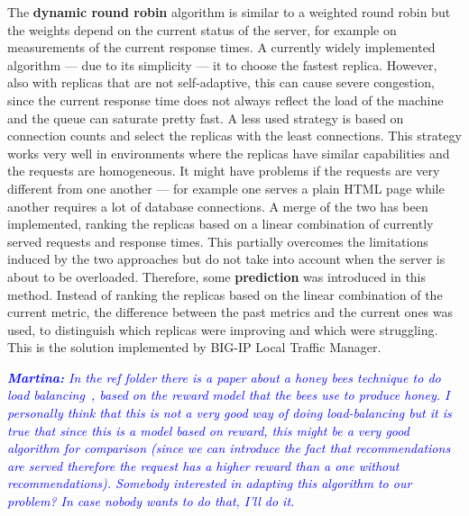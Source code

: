 The \textbf{dynamic round robin} algorithm is similar to a weighted
round robin but the weights depend on the current status of the
server, for example on measurements of the current response times. A
currently widely implemented algorithm --- due to its simplicity ---
it to choose the fastest replica. However, also with replicas that are
not self-adaptive, this can cause severe congestion, since the current
response time does not always reflect the load of the machine and the
queue can saturate pretty fast. A less used strategy is based on
connection counts and select the replicas with the least
connections. This strategy works very well in environments where the
replicas have similar capabilities and the requests are
homogeneous. It might have problems if the requests are very different
from one another --- for example one serves a plain HTML page while
another requires a lot of database connections. A merge of the two has
been implemented, ranking the replicas based on a linear combination
of currently served requests and response times. This partially
overcomes the limitations induced by the two approaches but do not
take into account when the server is about to be
overloaded. Therefore, some \textbf{prediction} was introduced in this
method. Instead of ranking the replicas based on the linear
combination of the current metric, the difference between the past
metrics and the current ones was used, to distinguish which replicas
were improving and which were struggling. This is the solution
implemented by BIG-IP Local Traffic Manager.

\textcolor{blue}{\textit{\textbf{Martina:} In the ref folder there is
    a paper about a honey bees technique to do load
    balancing~\cite{BeesBased:ADAPTIVE}, based on the reward model
    that the bees use to produce honey. I personally think that this
    is not a very good way of doing load-balancing but it is true that
    since this is a model based on reward, this might be a very good
    algorithm for comparison (since we can introduce the fact that
    recommendations are served therefore the request has a higher
    reward than a one without recommendations). Somebody interested in
    adapting this algorithm to our problem? In case nobody wants to do
    that, I'll do it.}}
